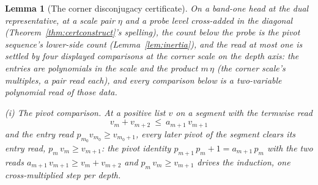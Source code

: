 \documentclass[11pt]{article}
\newtheorem{lemma}{Lemma}
\theoremstyle{definition}
\begin{document}
\begin{lemma}[The corner disconjugacy certificate]\label{lem:cornerpivot}
On a band-one head at the dual representative, at a scale pair
$\eta$ and a probe level cross-added in the diagonal
(Theorem~\ref{thm:certconstruct}'s spelling), the count
below the probe is the pivot sequence's lower-side count
(Lemma~\ref{lem:inertia}), and the read \emph{at most one} is
settled by four displayed comparisons at the corner scale on the
depth axis: the entries are
polynomials in the scale and the product $m\,\eta$ (the corner
scale's multiples, a pair read each), and every comparison below is a two-variable polynomial
read of those data.

\emph{(i) The pivot comparison.} At a positive list $v$ on a
segment with the termwise read
\[
v_{m}+v_{m+2}\ \le\ a_{m+1}\,v_{m+1}
\]
and the entry read $p_{m_0}v_{m_0}\ge v_{m_0+1}$, every later pivot
of the segment clears its entry read, $p_m\,v_m\ge v_{m+1}$: the pivot
identity $p_{m+1}\,p_m+1=a_{m+1}\,p_m$ with the two reads
$a_{m+1}\,v_{m+1}\ge v_m+v_{m+2}$ and $p_m\,v_m\ge v_{m+1}$ drives
the induction, one cross-multiplied step per depth.


\end{lemma}
\end{document}
